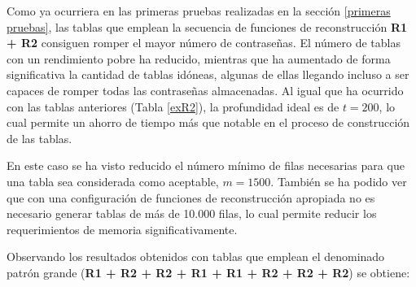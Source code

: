 \documentclass[12pt,spanish,listoffigures,listoftables]{tfgetsinf}
\begin{document}
Como ya ocurriera en las primeras pruebas realizadas en la sección \ref{primeras pruebas}, las tablas que emplean la secuencia de funciones de reconstrucción \textbf{R1 + R2} consiguen romper el mayor número de contraseñas. El número de tablas con un rendimiento pobre ha reducido, mientras que ha aumentado de forma significativa la cantidad de tablas idóneas, algunas de ellas llegando incluso a ser capaces de romper todas las contraseñas almacenadas. Al igual que ha ocurrido con las tablas anteriores (Tabla \ref{exR2}), la profundidad ideal es de $t = 200$, lo cual permite un ahorro de tiempo más que notable en el proceso de construcción de las tablas.

En este caso se ha visto reducido el número mínimo de filas necesarias para que una tabla sea considerada como aceptable, $m = 1500$. También se ha podido ver que con una configuración de funciones de reconstrucción apropiada no es necesario generar tablas de más de 10.000 filas, lo cual permite reducir los requerimientos de memoria significativamente.

Observando los resultados obtenidos con tablas que emplean el denominado patrón grande (\textbf{R1 + R2 + R2 + R1 + R1 + R2 + R2 + R2}) se obtiene:
\\
\\
\\
\end{document}
